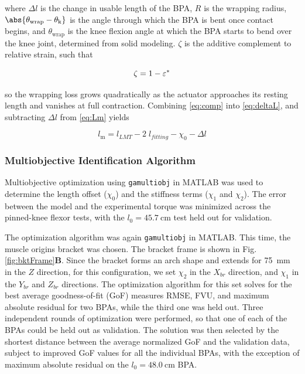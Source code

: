 where $\Delta l$ is the change in usable length of the BPA, $R$ is the wrapping radius, $\abs{\theta_\text{wrap}-\theta_\text{k}}$ is the angle through which the BPA is bent once contact begins, and $\theta_\text{wrap}$ is the knee flexion angle at which the BPA starts to bend over the knee joint, determined from solid modeling. $\zeta$ is the additive complement to relative strain, such that

\begin{equation}
    \zeta = 1-\varepsilon^*  \\
\label{eq:comp}
\end{equation}

so the wrapping loss grows quadratically as the actuator approaches its resting length and vanishes at full contraction. Combining \eqref{eq:comp} into \eqref{eq:deltaL}, and subtracting $\Delta l$ from  \eqref{eq:Lm} yields

\begin{equation}
    l_\text{m} = l_{LMT} - 2\;l_{fitting}  - \chi_{0} - \Delta l\label{eq:x3}
\end{equation}

\subsubsection{Multiobjective Identification Algorithm}\label{sec:identification}

Multiobjective optimization using \texttt{gamultiobj} in MATLAB was used to determine the length offset ($\chi_{0}$) and the stiffness terms ($\chi_{1}$ and $\chi_{2}$). The error between the model and the experimental torque was minimized across the pinned-knee flexor tests, with the $l_{0}=\qty{45.7}{\cm}$ test held out for validation.

The optimization algorithm was again \texttt{gamultiobj} in MATLAB. This time, the muscle origins bracket was chosen. The bracket frame is shown in Fig. \ref{fig:bktFrame}\textbf{B}. Since the bracket forms an arch shape and extends for \qty{75}{\mm} in the $Z$ direction, for this configuration, we set $\chi_{2}$ in the $X_{br}$ direction, and $\chi_{1}$ in the $Y_{br}$ and $Z_{br}$ directions. The optimization algorithm for this set solves for the best average goodness-of-fit (GoF) measures RMSE, FVU, and maximum absolute residual for two BPAs, while the third one was held out. Three independent rounds of optimization were performed, so that one of each of the BPAs could be held out as validation. The solution was then selected by the shortest distance between the average normalized GoF and the validation data, subject to improved GoF values for all the individual BPAs, with the exception of maximum absolute residual on the $l_{0}=\qty{48.0}{\cm}$ BPA.

